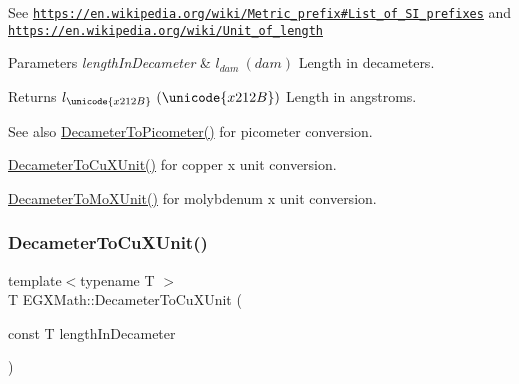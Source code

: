 See \href{https://en.wikipedia.org/wiki/Metric_prefix#List_of_SI_prefixes}{\tt https\+://en.\+wikipedia.\+org/wiki/\+Metric\+\_\+prefix\#\+List\+\_\+of\+\_\+\+S\+I\+\_\+prefixes} and \href{https://en.wikipedia.org/wiki/Unit_of_length}{\tt https\+://en.\+wikipedia.\+org/wiki/\+Unit\+\_\+of\+\_\+length} 
\begin{DoxyParams}{Parameters}
{\em length\+In\+Decameter} & $ l_{dam}\ (dam)$ Length in decameters. \\
\hline
\end{DoxyParams}
\begin{DoxyReturn}{Returns}
$ l_{\unicode{x212B}}\ (\unicode{x212B})$ Length in angstroms. 
\end{DoxyReturn}
\begin{DoxySeeAlso}{See also}
\mbox{\hyperlink{group___e_g_x_math-_conversions-_length_conversions-_s_i-_decameter-_s_i_gab265bbced03f7b08cf4ad0db29da6dfd}{Decameter\+To\+Picometer()}} for picometer conversion. 

\mbox{\hyperlink{group___e_g_x_math-_conversions-_length_conversions-_s_i-_decameter-_non-_s_i_gaf256500ca4f0b7a62018ea61078c29e3}{Decameter\+To\+Cu\+X\+Unit()}} for copper x unit conversion. 

\mbox{\hyperlink{group___e_g_x_math-_conversions-_length_conversions-_s_i-_decameter-_non-_s_i_ga9e345feeb2568ded9fdceaf1d23d0ca6}{Decameter\+To\+Mo\+X\+Unit()}} for molybdenum x unit conversion. 
\end{DoxySeeAlso}
\mbox{\label{group___e_g_x_math-_conversions-_length_conversions-_s_i-_decameter-_non-_s_i_gaf256500ca4f0b7a62018ea61078c29e3}} 
\subsubsection{\texorpdfstring{Decameter\+To\+Cu\+X\+Unit()}{DecameterToCuXUnit()}}
{\footnotesize\ttfamily template$<$typename T $>$ \\
T E\+G\+X\+Math\+::\+Decameter\+To\+Cu\+X\+Unit (\begin{DoxyParamCaption}\item[{const T}]{length\+In\+Decameter }\end{DoxyParamCaption})}



